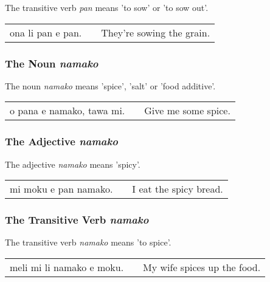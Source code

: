 The transitive verb \textit{pan} means 'to sow' or 'to sow out'.

\begin{supertabular}{p{5,5cm}|ll}
ona li pan e pan. && They're sowing the grain. \\
\end{supertabular} 

%
%
\subsubsection*{The Noun \textit{namako}}
%

The noun \textit{namako} means 'spice', 'salt' or 'food additive'.

\begin{supertabular}{p{5,5cm}|ll}
o pana e namako, tawa mi. &&  Give me some spice. \\
\end{supertabular} 

%
%
\subsubsection*{The Adjective \textit{namako}}
%

The adjective \textit{namako} means 'spicy'. 

\begin{supertabular}{p{5,5cm}|ll}
mi moku e pan namako. && I eat the spicy bread. \\
\end{supertabular}

%
%
\subsubsection*{The Transitive Verb \textit{namako}}
%

The transitive verb \textit{namako} means 'to spice'. 

\begin{supertabular}{p{5,5cm}|ll}
meli mi li namako e moku. &&  My wife spices up the food. \\
\end{supertabular}

